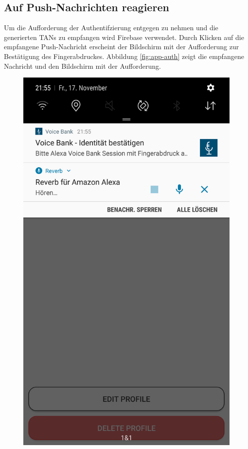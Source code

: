\subsection{Auf Push-Nachrichten reagieren}
\label{subsec:app-push}
Um die Aufforderung der Authentifzierung entgegen zu nehmen und die generierten \acp{TAN} zu empfangen wird Firebase verwendet. Durch Klicken auf die empfangene Push-Nachricht erscheint der Bildschirm mit der Aufforderung zur Bestätigung des Fingerabdruckes. Abbildung \ref{fig:app-auth} zeigt die empfangene Nachricht und den Bildschirm mit der Aufforderung. 

\begin{figure}[h]
  \centering
  \begin{minipage}[b]{0.45\textwidth}
    \includegraphics[width=\textwidth]{bilder/4_appPushNachricht.png}

\end{minipage}
\end{figure}
